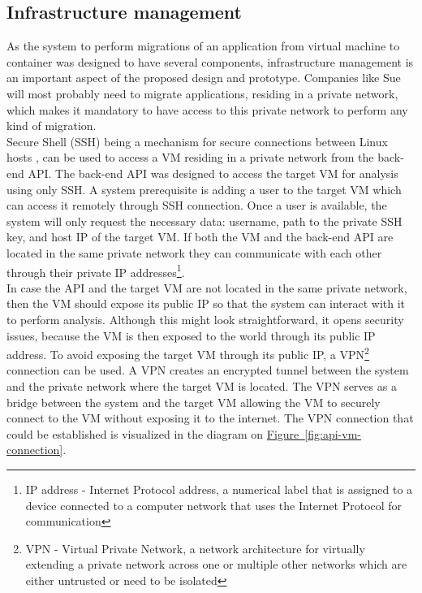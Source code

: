 \documentclass[twocolumn]{article}
\newcommand{\FigRef}[1]{\hyperref[#1]{Figure~\ref{#1}}}
\begin{document}
\subsection{Infrastructure management}
As the system to perform migrations of an application from virtual machine to container was designed to have several components, infrastructure management is an important aspect of the proposed design and prototype. Companies like Sue will most probably need to migrate applications, residing in a private network, which makes it mandatory to have access to this private network to perform any kind of migration. \\

Secure Shell (SSH) being a mechanism for secure connections between Linux hosts \cite{Both-2023}, can be used to access a VM residing in a private network from the back-end API. The back-end API was designed to access the target VM for analysis using only SSH. A system prerequisite is adding a user to the target VM which can access it remotely through SSH connection. Once a user is available, the system will only request the necessary data: username, path to the private SSH key, and host IP of the target VM. If both the VM and the back-end API are located in the same private network they can communicate with each other through their private IP addresses\footnote{IP address - Internet Protocol address, a numerical label that is assigned to a device connected to a computer network that uses the Internet Protocol for communication}. \\

In case the API and the target VM are not located in the same private network, then the VM should expose its public IP so that the system can interact with it to perform analysis. Although this might look straightforward, it opens security issues, because the VM is then exposed to the world through its public IP address. To avoid exposing the target VM through its public IP, a VPN\footnote{VPN - Virtual Private Network, a network architecture for virtually extending a private network across one or multiple other networks which are either untrusted or need to be isolated} connection can be used. A VPN creates an encrypted tunnel between the system and the private network where the target VM is located. The VPN serves as a bridge between the system and the target VM allowing the VM to securely connect to the VM without exposing it to the internet. The VPN connection that could be established is visualized in the diagram on \FigRef{fig:api-vm-connection}. 
\end{document}
